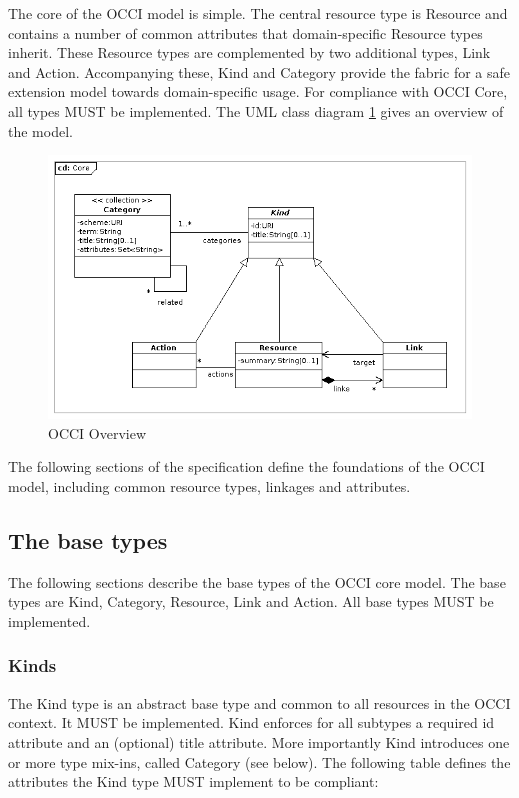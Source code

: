 \documentclass[10pt,a4paper]{article}
\begin{document}
The core of the OCCI model is simple. The central resource type is Resource and contains a number of common attributes that domain-specific Resource types inherit. These Resource types are complemented by two additional types, Link and Action. Accompanying these, Kind and Category provide the fabric for a safe extension model towards domain-specific usage. For compliance with OCCI Core, all types MUST be implemented. The UML class diagram \ref{fig:occi_core} gives an overview of the model.

\clearpage
\begin{figure}[!h]
	\centering
	\includegraphics[scale=0.5]{figs/core_model.png}
	\caption{OCCI Overview}
	\label{fig:occi_core}
\end{figure}

The following sections of the specification define the foundations of the OCCI model, including common resource types, linkages and attributes.

\subsection{The base types}
The following sections describe the base types of the OCCI core model. The base types are Kind, Category, Resource, Link and Action. All base types MUST be implemented.

\subsubsection{Kinds}
The Kind type is an abstract base type and common to all resources in the OCCI context. It MUST be implemented. Kind enforces for all subtypes a required id attribute and an (optional) title attribute. More importantly Kind introduces one or more type mix-ins, called Category (see below). The following table defines the attributes the Kind type MUST implement to be compliant:
\end{document}
